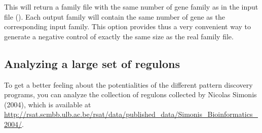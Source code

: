 This will return a family file with the same number of gene family as
in the input file (). Each output family will contain
the same number of gene as the corresponding input family. This option
provides thus a very convenient way to generate a negative control of
exactly the same size as the real family file.

\subsection{Analyzing a large set of regulons}

To get a better feeling about the potentialities of the different
pattern discovery programs, you can analyze the collection of regulons
collected by Nicolas Simonis (2004), which is available at
\url{http://rsat.scmbb.ulb.ac.be/rsat/data/published\_data/Simonis\_Bioinformatics\_2004/}.

